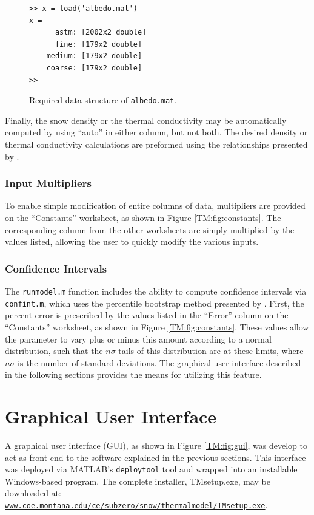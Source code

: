 \begin{figure}[ht!]
\begin{singlespaced}\begin{lstlisting}[style=figure]
>> x = load('albedo.mat')
x = 
      astm: [2002x2 double]
      fine: [179x2 double]
    medium: [179x2 double]
    coarse: [179x2 double]
>> 
\end{lstlisting}\end{singlespaced}
\caption{Required data structure of \texttt{albedo.mat}.}
\label{TM:fig:albedo}
\end{figure}

Finally, the snow density or the thermal conductivity may be automatically computed by using ``auto'' in either column, but not both.  The desired density or thermal conductivity calculations are preformed using the relationships presented by \citet{sturm1997}.

\subsubsection{Input Multipliers}
To enable simple modification of entire columns of data, multipliers are provided on the ``Constants'' worksheet, as shown in Figure \ref{TM:fig:constants}.  The corresponding column from the other worksheets are simply multiplied by the values listed, allowing the user to quickly modify the various inputs.

\subsubsection{Confidence Intervals}\label{TM:sec:conf} The \texttt{runmodel.m} function includes the ability to compute confidence intervals via \texttt{confint.m}, which uses the percentile bootstrap method presented by \citet{efron1993}.  First, the percent error is prescribed by the values listed in the ``Error'' column on the ``Constants'' worksheet, as shown in Figure \ref{TM:fig:constants}.  These values allow the parameter to vary plus or minus this amount according to a normal distribution, such that the $n\sigma$ tails of this distribution are at these limits, where $n\sigma$ is the number of standard deviations.  The graphical user interface described in the following sections provides the means for utilizing this feature.

\section{Graphical User Interface}\label{TM:sec:gui}
A graphical user interface (GUI), as shown in Figure \ref{TM:fig:gui}, was develop to act as front-end to the software explained in the previous sections. This interface was deployed via MATLAB's \texttt{deploytool} tool and wrapped into an installable Windows-based program.  The complete installer, TMsetup.exe, may be downloaded at: \href{http://www.coe.montana.edu/ce/subzero/snow/thermalmodel/TMsetup.exe}{\nolinkurl{www.coe.montana.edu/ce/subzero/snow/thermalmodel/TMsetup.exe}}.

